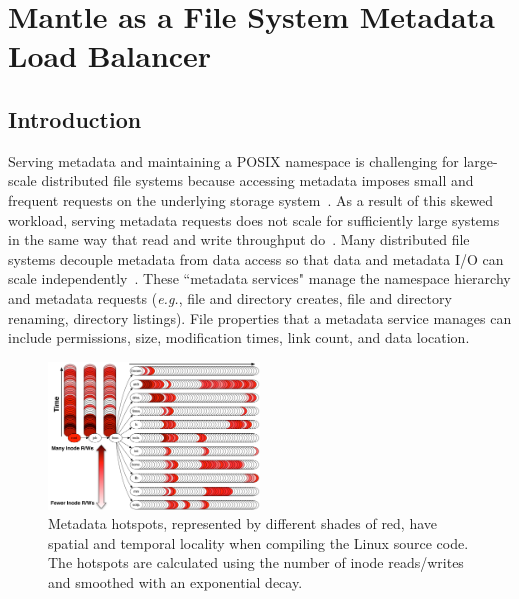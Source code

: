 \chapter{Mantle as a File System Metadata Load Balancer}
\label{mantle}

\section{Introduction}								    %
\label{introduction}								    %
Serving metadata and maintaining a POSIX namespace is challenging for large-scale distributed file systems because accessing metadata imposes small and frequent requests on the underlying storage system~\cite{roselli:atec2000-FS-workloads}. As a result of this skewed workload, serving metadata requests does not scale for sufficiently large systems in the same way that read and write throughput do~\cite{abad:ucc2012-mimesis, alam:pdsw2011-metadata-scaling, weil:osdi2006-ceph}. Many distributed file systems decouple metadata from data access so that data and metadata I/O can scale independently~\cite{alam:pdsw2011-metadata-scaling, ghemawat:sosp2003-gfs, hildebrand:msst2005-pnfs,weil:osdi2006-ceph,welch:fast2008-panasas,xing:sc2009-skyfs}. These ``metadata services" manage the namespace hierarchy and metadata requests ({\it e.g.}, file and directory creates, file and directory renaming, directory listings). File properties that a metadata service manages can include permissions, size, modification times, link count, and data location. 


\begin{figure}[tb]
	\centering	
	\includegraphics[width=0.5\textwidth]{./chapters/mantle/workload-tar.png}
	\caption{Metadata hotspots, represented by different shades of red, have spatial and temporal locality when compiling the Linux source code. The hotspots are calculated using the number of inode reads/writes and smoothed with an exponential decay. \label{figure:workload-tar}}
\end{figure}

